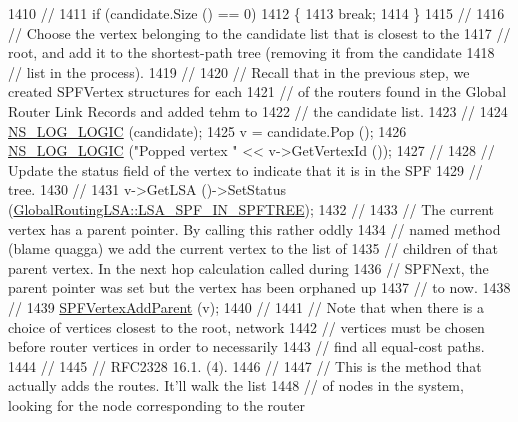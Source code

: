\begin{DoxyCode}
1410 \textcolor{comment}{//}
1411       \textcolor{keywordflow}{if} (candidate.Size () == 0)
1412         \{
1413           \textcolor{keywordflow}{break};
1414         \}
1415 \textcolor{comment}{//}
1416 \textcolor{comment}{// Choose the vertex belonging to the candidate list that is closest to the}
1417 \textcolor{comment}{// root, and add it to the shortest-path tree (removing it from the candidate}
1418 \textcolor{comment}{// list in the process).}
1419 \textcolor{comment}{//}
1420 \textcolor{comment}{// Recall that in the previous step, we created SPFVertex structures for each}
1421 \textcolor{comment}{// of the routers found in the Global Router Link Records and added tehm to }
1422 \textcolor{comment}{// the candidate list.}
1423 \textcolor{comment}{//}
1424       \hyperlink{group__logging_ga88acd260151caf2db9c0fc84997f45ce}{NS\_LOG\_LOGIC} (candidate);
1425       v = candidate.Pop ();
1426       \hyperlink{group__logging_ga88acd260151caf2db9c0fc84997f45ce}{NS\_LOG\_LOGIC} (\textcolor{stringliteral}{"Popped vertex "} << v->GetVertexId ());
1427 \textcolor{comment}{//}
1428 \textcolor{comment}{// Update the status field of the vertex to indicate that it is in the SPF}
1429 \textcolor{comment}{// tree.}
1430 \textcolor{comment}{//}
1431       v->GetLSA ()->SetStatus (\hyperlink{classns3_1_1GlobalRoutingLSA_a18bf63da580856fe1cc158aa855af1bda2a14fe5ba992deb9a1cb953f77ec8072}{GlobalRoutingLSA::LSA\_SPF\_IN\_SPFTREE});
1432 \textcolor{comment}{//}
1433 \textcolor{comment}{// The current vertex has a parent pointer.  By calling this rather oddly }
1434 \textcolor{comment}{// named method (blame quagga) we add the current vertex to the list of }
1435 \textcolor{comment}{// children of that parent vertex.  In the next hop calculation called during}
1436 \textcolor{comment}{// SPFNext, the parent pointer was set but the vertex has been orphaned up}
1437 \textcolor{comment}{// to now.}
1438 \textcolor{comment}{//}
1439       \hyperlink{classns3_1_1GlobalRouteManagerImpl_ae7824a06e22187d1dc6823c46c95a3fc}{SPFVertexAddParent} (v);
1440 \textcolor{comment}{//}
1441 \textcolor{comment}{// Note that when there is a choice of vertices closest to the root, network}
1442 \textcolor{comment}{// vertices must be chosen before router vertices in order to necessarily}
1443 \textcolor{comment}{// find all equal-cost paths. }
1444 \textcolor{comment}{//}
1445 \textcolor{comment}{// RFC2328 16.1. (4). }
1446 \textcolor{comment}{//}
1447 \textcolor{comment}{// This is the method that actually adds the routes.  It'll walk the list}
1448 \textcolor{comment}{// of nodes in the system, looking for the node corresponding to the router}

\end{DoxyCode}

